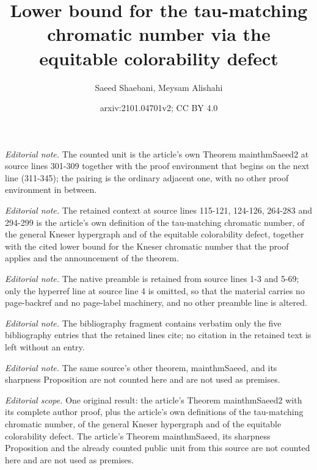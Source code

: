 \documentclass[11pt]{amsart}
\title{Lower bound for the tau-matching chromatic number via the equitable colorability defect}
\author{Saeed Shaebani, Meysam Alishahi}
\date{arxiv:2101.04701v2; CC BY 4.0}
\theoremstyle{definition}
\begin{document}
\maketitle
\noindent\textit{Editorial note.} The counted unit is the article's own Theorem mainthmSaeed2 at source lines 301-309 together with the proof environment that begins on the next line (311-345); the pairing is the ordinary adjacent one, with no other proof environment in between.\par\medskip
\noindent\textit{Editorial note.} The retained context at source lines 115-121, 124-126, 264-283 and 294-299 is the article's own definition of the tau-matching chromatic number, of the general Kneser hypergraph and of the equitable colorability defect, together with the cited lower bound for the Kneser chromatic number that the proof applies and the announcement of the theorem.\par\medskip
\noindent\textit{Editorial note.} The native preamble is retained from source lines 1-3 and 5-69; only the hyperref line at source line 4 is omitted, so that the material carries no page-backref and no page-label machinery, and no other preamble line is altered.\par\medskip
\noindent\textit{Editorial note.} The bibliography fragment contains verbatim only the five bibliography entries that the retained lines cite; no citation in the retained text is left without an entry.\par\medskip
\noindent\textit{Editorial note.} The same source's other theorem, mainthmSaeed, and its sharpness Proposition are not counted here and are not used as premises.\par\medskip
\noindent\textit{Editorial scope.} One original result: the article's Theorem mainthmSaeed2 with its complete author proof, plus the article's own definitions of the tau-matching chromatic number, of the general Kneser hypergraph and of the equitable colorability defect. The article's Theorem mainthmSaeed, its sharpness Proposition and the already counted public unit from this source are not counted here and are not used as premises.\par\medskip
\end{document}
